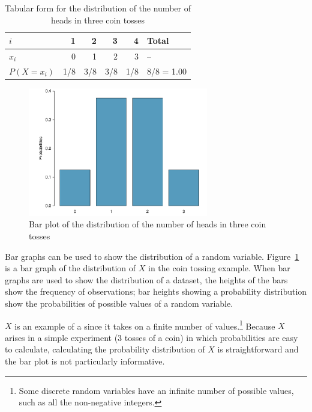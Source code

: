 \begin{table}[h]
	\centering 
	\begin{tabular}{l rrrr l}
		\hline 
		$i$ & 1 & 2 & 3 & 4 & Total\\
		\hline
		$x_i$ & 0 & 1 & 2 & 3 & --\\
		$P(X = x_i)$ & 1/8 & 3/8 & 3/8 & 1/8 & 8/8 = 1.00\\
	\end{tabular}
	\caption{Tabular form for the distribution of the number of heads in three coin tosses}
	\label{distCoinTossing}
\end{table}

\begin{figure}[h]
\centering
\includegraphics[width=0.7\textwidth]
{ch_probability_oi_biostat/figures/barPlotCoinTossing/barPlotCoinTossing.pdf}
\caption{Bar plot of the distribution of the number of heads in three coin tosses }
\label{barPlotCoinTossing}
\end{figure}

Bar graphs can be used to show the distribution of a random variable.  Figure~\ref{barPlotCoinTossing} is a bar graph of the distribution of $X$ in the coin tossing example. When bar graphs are used to show the distribution of a dataset, the heights of the bars show the frequency of observations; bar heights showing a probability distribution show the probabilities of possible values of a random variable.

$X$ is an example of a  since it takes on a finite number of values.\footnote{Some discrete random variables have an infinite number of possible values, such as all the non-negative integers.}  Because $X$ arises in a simple experiment (3 tosses of a coin) in which probabilities are easy to calculate, calculating the probability distribution of $X$ is straightforward and the bar plot is not particularly informative.  

